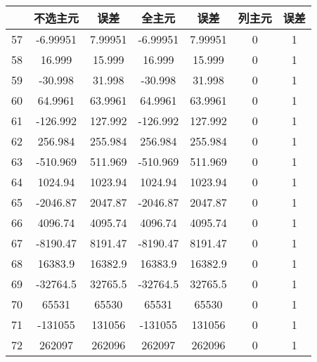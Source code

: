 \documentclass{article}
\begin{document}
\begin{table}[H]
	\centering
	\begin{tabular}{lcccccc}
		\toprule
		\textbf{} & \textbf{不选主元} & \textbf{误差} & \textbf{全主元} & \textbf{误差} & \textbf{列主元} & \textbf{误差} \\
		\midrule
		57        & -6.99951    & 7.99951       & -6.99951    & 7.99951       & 0           & 1             \\
		58        & 16.999      & 15.999        & 16.999      & 15.999        & 0           & 1             \\
		59        & -30.998     & 31.998        & -30.998     & 31.998        & 0           & 1             \\
		60        & 64.9961     & 63.9961       & 64.9961     & 63.9961       & 0           & 1             \\
		61        & -126.992    & 127.992       & -126.992    & 127.992       & 0           & 1             \\
		62        & 256.984     & 255.984       & 256.984     & 255.984       & 0           & 1             \\
		63        & -510.969    & 511.969       & -510.969    & 511.969       & 0           & 1             \\
		64        & 1024.94     & 1023.94       & 1024.94     & 1023.94       & 0           & 1             \\
		65        & -2046.87    & 2047.87       & -2046.87    & 2047.87       & 0           & 1             \\
		66        & 4096.74     & 4095.74       & 4096.74     & 4095.74       & 0           & 1             \\
		67        & -8190.47    & 8191.47       & -8190.47    & 8191.47       & 0           & 1             \\
		68        & 16383.9     & 16382.9       & 16383.9     & 16382.9       & 0           & 1             \\
		69        & -32764.5    & 32765.5       & -32764.5    & 32765.5       & 0           & 1             \\
		70        & 65531       & 65530         & 65531       & 65530         & 0           & 1             \\
		71        & -131055     & 131056        & -131055     & 131056        & 0           & 1             \\
		72        & 262097      & 262096        & 262097      & 262096        & 0           & 1             \\       

\end{tabular}
\end{table}
\end{document}
